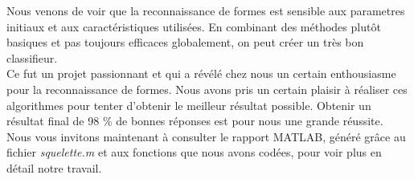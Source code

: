 Nous venons de voir que la reconnaissance de formes est sensible 
aux parametres initiaux et aux caractéristiques utilisées. En combinant
des méthodes plutôt basiques et pas toujours efficaces globalement, 
on peut créer un très bon classifieur. \\
Ce fut un projet passionnant et qui a révélé chez nous un certain 
enthousiasme pour la reconnaissance de formes. Nous avons pris un 
certain plaisir à réaliser ces algorithmes pour tenter d'obtenir
le meilleur résultat possible. Obtenir un résultat final de 98 \%
de bonnes réponses est pour nous une grande réussite.\\
Nous vous invitons maintenant à consulter le rapport MATLAB, généré grâce au fichier \textit{squelette.m} et aux fonctions que nous avons codées, pour voir plus en détail notre travail.
